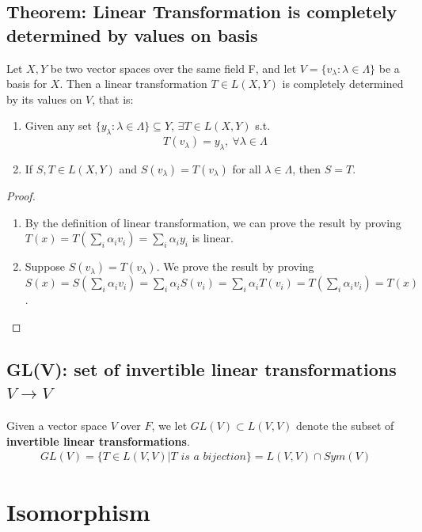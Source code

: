 \documentclass[11pt]{elegantbook}
\begin{document}
\subsection{Theorem: Linear Transformation is completely determined by values on basis}
\begin{theorem}
    Let $X, Y$ be two vector spaces over the same field F, and let $V = \{v_\lambda : \lambda \in \Lambda\}$ be a basis for $X$. Then a linear transformation $T \in L(X, Y)$ is completely determined by its values on $V$, that is:
    \begin{enumerate}
        \item Given any set $\{y_\lambda : \lambda \in \Lambda\} \subseteq Y$, $\exists T \in L(X, Y)$ s.t. $$T(v_\lambda)=y_\lambda,\ \forall \lambda\in\Lambda$$
        \item If $S,T\in L(X,Y)$ and $S(v_\lambda)=T(v_\lambda)$ for all $\lambda\in\Lambda$, then $S=T$.
    \end{enumerate}
\end{theorem}
\begin{proof}
    \begin{enumerate}
        \item By the definition of linear transformation, we can prove the result by proving $T(x)=T(\sum_i\alpha_i v_i)=\sum_i\alpha_i y_i$ is linear.
        \item Suppose $S(v_\lambda)=T(v_\lambda)$. We prove the result by proving $S(x)=S(\sum_i\alpha_i v_i)=\sum_i\alpha_i S(v_i)=\sum_i\alpha_i T(v_i)=T(\sum_i\alpha_i v_i)=T(x)$.
    \end{enumerate}

\end{proof}

\subsection{GL(V): set of invertible linear transformations $V \rightarrow	V$}
Given a vector space $V$ over $F$, we let $GL(V) \subset L(V, V)$ denote the subset of \textbf{invertible linear transformations}.
\begin{equation}
    \begin{aligned}
        GL(V)=\{T\in L(V, V)| T \textit{ is a bijection}\}=L(V, V)\cap Sym(V)
    \end{aligned}
    \nonumber
\end{equation}


\section{Isomorphism}
\end{document}
